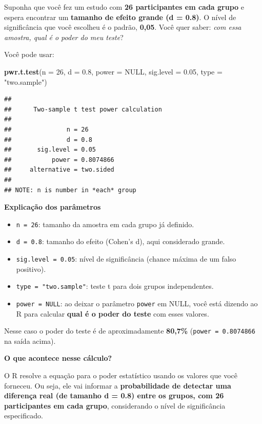 \documentclass[
]{book}
\newenvironment{Shaded}{\begin{snugshade}}{\end{snugshade}}
\newcommand{\AttributeTok}[1]{\textcolor[rgb]{0.13,0.29,0.53}{#1}}
\newcommand{\ConstantTok}[1]{\textcolor[rgb]{0.56,0.35,0.01}{#1}}
\newcommand{\DecValTok}[1]{\textcolor[rgb]{0.00,0.00,0.81}{#1}}
\newcommand{\FloatTok}[1]{\textcolor[rgb]{0.00,0.00,0.81}{#1}}
\newcommand{\FunctionTok}[1]{\textcolor[rgb]{0.13,0.29,0.53}{\textbf{#1}}}
\newcommand{\NormalTok}[1]{#1}
\newcommand{\StringTok}[1]{\textcolor[rgb]{0.31,0.60,0.02}{#1}}
\providecommand{\tightlist}{%
  \setlength{\itemsep}{0pt}\setlength{\parskip}{0pt}}
\begin{document}
Suponha que você fez um estudo com \textbf{26 participantes em cada grupo} e espera encontrar um \textbf{tamanho de efeito grande (d = 0.8)}. O nível de significância que você escolheu é o padrão, \textbf{0,05}. Você quer saber: \emph{com essa amostra, qual é o poder do meu teste}?

Você pode usar:

\begin{Shaded}
\begin{Highlighting}[]
\FunctionTok{pwr.t.test}\NormalTok{(}\AttributeTok{n =} \DecValTok{26}\NormalTok{, }\AttributeTok{d =} \FloatTok{0.8}\NormalTok{, }\AttributeTok{power =} \ConstantTok{NULL}\NormalTok{, }\AttributeTok{sig.level =} \FloatTok{0.05}\NormalTok{, }\AttributeTok{type =} \StringTok{"two.sample"}\NormalTok{)}
\end{Highlighting}
\end{Shaded}

\begin{verbatim}
## 
##      Two-sample t test power calculation 
## 
##               n = 26
##               d = 0.8
##       sig.level = 0.05
##           power = 0.8074866
##     alternative = two.sided
## 
## NOTE: n is number in *each* group
\end{verbatim}

\textbf{Explicação dos parâmetros}

\begin{itemize}
\tightlist
\item
  \texttt{n\ =\ 26}: tamanho da amostra em cada grupo já definido.
\item
  \texttt{d\ =\ 0.8}: tamanho do efeito (Cohen's d), aqui considerado grande.
\item
  \texttt{sig.level\ =\ 0.05}: nível de significância (chance máxima de um falso positivo).
\item
  \texttt{type\ =\ "two.sample"}: teste t para dois grupos independentes.
\item
  \texttt{power\ =\ NULL}: ao deixar o parâmetro \texttt{power} em NULL, você está dizendo ao R para calcular \textbf{qual é o poder do teste} com esses valores.
\end{itemize}

Nesse caso o poder do teste é de aproximadamente \textbf{80,7\%} (\texttt{power\ =\ 0.8074866} na saída acima).

\textbf{O que acontece nesse cálculo?}

O R resolve a equação para o poder estatístico usando os valores que você forneceu. Ou seja, ele vai informar a \textbf{probabilidade de detectar uma diferença real (de tamanho d = 0.8) entre os grupos, com 26 participantes em cada grupo}, considerando o nível de significância especificado.
\end{document}
